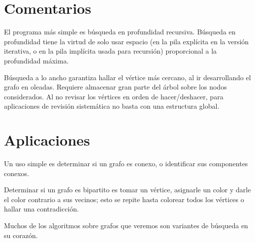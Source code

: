 \section{Comentarios}
\label{sec:comments-graph-traversal}

  El programa más simple es búsqueda en profundidad recursiva.
  Búsqueda en profundidad tiene la virtud de solo usar espacio
  (en la pila explícita en la versión iterativa,
   o en la pila implícita usada para recursión)
  proporcional a la profundidad máxima.

  Búsqueda a lo ancho garantiza hallar el vértice más cercano,
  al ir desarrollando el grafo en oleadas.
  Requiere almacenar gran parte del árbol sobre los nodos considerados.
  Al no revisar los vértices en orden de hacer/deshacer,
  para aplicaciones de revisión sistemática
  no basta con una estructura global.

\section{Aplicaciones}
\label{sec:graph-traversal-uses}

  Un uso simple es determinar si un grafo es conexo,
  o identificar sus componentes conexos.

  Determinar si un grafo es bipartito es tomar un vértice,
  asignarle un color y darle el color contrario a sus vecinos;
  esto se repite hasta colorear todos los vértices o hallar una contradicción.

  Muchos de los algoritmos sobre grafos que veremos
  son variantes de búsqueda en su corazón.





